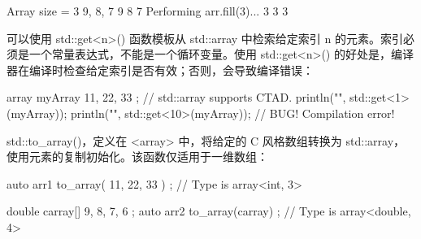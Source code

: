 \begin{shell}
Array size = 3
9, 8, 7
9 8 7
Performing arr.fill(3)...
3 3 3
\end{shell}

可以使用 std::get<n>() 函数模板从 std::array 中检索给定索引 n 的元素。索引必须是一个常量表达式，不能是一个循环变量。使用 std::get<n>() 的好处是，编译器在编译时检查给定索引是否有效；否则，会导致编译错误：

\begin{cpp}
array myArray { 11, 22, 33 }; // std::array supports CTAD.
println("{}", std::get<1>(myArray));
println("{}", std::get<10>(myArray)); // BUG! Compilation error!
\end{cpp}

std::to\_array()，定义在 <array> 中，将给定的 C 风格数组转换为 std::array，使用元素的复制初始化。该函数仅适用于一维数组：

\begin{cpp}
auto arr1 { to_array({ 11, 22, 33 }) }; // Type is array<int, 3>

double carray[] { 9, 8, 7, 6 };
auto arr2 { to_array(carray) }; // Type is array<double, 4>
\end{cpp}









